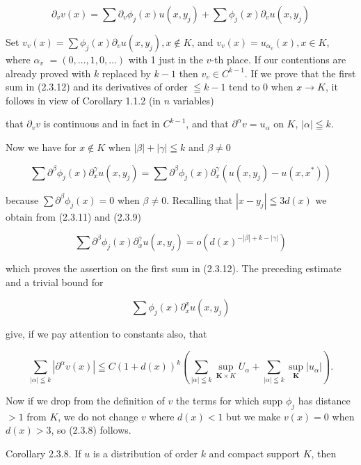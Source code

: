 \begin{equation*}
\partial_{v} v(x)=\sum \partial_{v} \phi_{j}(x) u\left(x, y_{j}\right)+\sum \phi_{j}(x) \partial_{v} u\left(x, y_{j}\right) \tag{2.3.12}
\end{equation*}


Set $v_{v}(x)=\sum \phi_{j}(x) \partial_{v} u\left(x, y_{j}\right), x \notin K$, and $v_{v}(x)=u_{\alpha_{v}}(x), x \in K$, where $\alpha_{v}$ $=(0, \ldots, 1,0, \ldots)$ with 1 just in the $v$-th place. If our contentions are already proved with $k$ replaced by $k-1$ then $v_{v} \in C^{k-1}$. If we prove that the first sum in (2.3.12) and its derivatives of order $\leqq k-1$ tend to 0 when $x \rightarrow K$, it follows in view of Corollary 1.1.2 (in $n$ variables)

that $\partial_{v} v$ is continuous and in fact in $C^{k-1}$, and that $\partial^{\alpha} v=u_{\alpha}$ on $K$, $|\alpha| \leqq k$.

Now we have for $x \notin K$ when $|\beta|+|\gamma| \leqq k$ and $\beta \neq 0$

\[
\sum \partial^{\beta} \phi_{j}(x) \partial_{x}^{\gamma} u\left(x, y_{j}\right)=\sum \partial^{\beta} \phi_{j}(x) \partial_{x}^{\gamma}\left(u\left(x, y_{j}\right)-u\left(x, x^{*}\right)\right)
\]

because $\sum \partial^{\beta} \phi_{j}(x)=0$ when $\beta \neq 0$. Recalling that $\left|x-y_{j}\right| \leqq 3 d(x)$ we obtain from (2.3.11) and (2.3.9)

\[
\sum \partial^{\beta} \phi_{j}(x) \partial_{x}^{\gamma} u\left(x, y_{j}\right)=o\left(d(x)^{-|\beta|+k-|\gamma|}\right)
\]

which proves the assertion on the first sum in (2.3.12). The preceding estimate and a trivial bound for

\[
\sum \phi_{j}(x) \partial_{x}^{x} u\left(x, y_{j}\right)
\]

give, if we pay attention to constants also, that

\[
\sum_{|\alpha| \leqq k}\left|\partial^{\alpha} v(x)\right| \leqq C(1+d(x))^{k}\left(\sum_{|\alpha| \leqq k} \sup _{\boldsymbol{K} \times K} U_{\alpha}+\sum_{|\alpha| \leqq k} \sup _{\boldsymbol{K}}\left|u_{\alpha}\right|\right) .
\]

Now if we drop from the definition of $v$ the terms for which supp $\phi_{j}$ has distance $>1$ from $K$, we do not change $v$ where $d(x)<1$ but we make $v(x)=0$ when $d(x)>3$, so (2.3.8) follows.

Corollary 2.3.8. If $u$ is a distribution of order $k$ and compact support $K$, then


